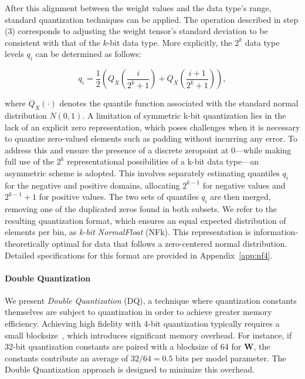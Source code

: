 After this alignment between the weight values and the data type’s range, standard quantization techniques can be applied. The operation described in step (3) corresponds to adjusting the weight tensor’s standard deviation to be consistent with that of the $k$-bit data type. More explicitly, the $2^k$ data type levels $q_i$ can be determined as follows:

\begin{equation}
q_i  = \frac{1}{2}\left( Q_X\left(\frac{i}{2^k+1}\right) + Q_X\left(\frac{i+1}{2^k+1}\right)\right),
\end{equation}

where $Q_X(\cdot)$ denotes the quantile function associated with the standard normal distribution $N(0,1)$. A limitation of symmetric k-bit quantization lies in the lack of an explicit zero representation, which poses challenges when it is necessary to quantize zero-valued elements such as padding without incurring any error. To address this and ensure the presence of a discrete zeropoint at $0$—while making full use of the $2^k$ representational possibilities of a k-bit data type—an asymmetric scheme is adopted. This involves separately estimating quantiles $q_i$ for the negative and positive domains, allocating $2^{k-1}$ for negative values and $2^{k-1}+1$ for positive values. The two sets of quantiles $q_i$ are then merged, removing one of the duplicated zeros found in both subsets. We refer to the resulting quantization format, which ensures an equal expected distribution of elements per bin, as \emph{k-bit NormalFloat} (NFk). This representation is information-theoretically optimal for data that follows a zero-centered normal distribution. Detailed specifications for this format are provided in Appendix~\ref{app:nf4}.

\paragraph{Double Quantization{}}
We present \emph{Double Quantization} (DQ), a technique where quantization constants themselves are subject to quantization in order to achieve greater memory efficiency. Achieving high fidelity with 4-bit quantization typically requires a small blocksize~\citep{dettmers2022case}, which introduces significant memory overhead. For instance, if 32-bit quantization constants are paired with a blocksize of 64 for $\mathbf{W}$, the constants contribute an average of $32/64 = 0.5$ bits per model parameter. The Double Quantization approach is designed to minimize this overhead.


